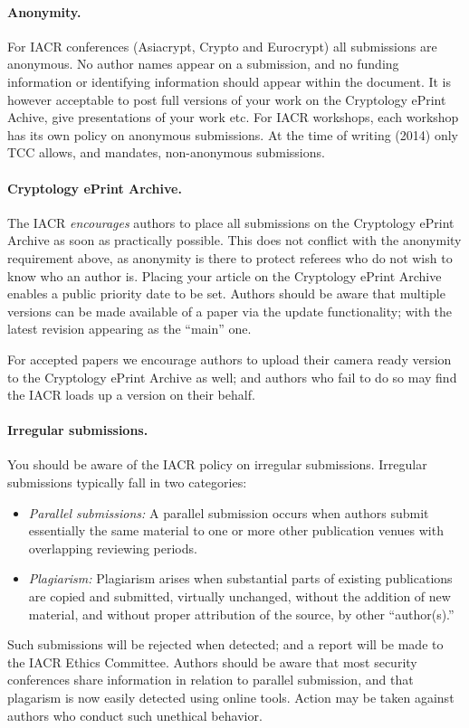 \documentclass[11pt]{article}
\begin{document}
\paragraph{Anonymity.}
For IACR conferences (Asiacrypt, Crypto and Eurocrypt)
all submissions are anonymous. 
No author names appear on a submission, and no funding information
or identifying information should appear within the document.
It is however acceptable to post full versions of your work
on the Cryptology ePrint Achive, give presentations of your work
etc.
For IACR workshops, each workshop has its own policy
on anonymous submissions. At the time of writing (2014) only TCC allows,
and mandates, non-anonymous submissions.

\paragraph{Cryptology ePrint Archive.}
The IACR \emph{encourages} authors to place all submissions on
the Cryptology ePrint Archive as soon as practically possible.
This does not conflict with the anonymity requirement above, as
anonymity is there to protect referees who do not wish to 
know who an author is.
Placing your article on the Cryptology ePrint Archive enables a
public priority date to be set.
Authors should be aware that multiple versions can be made
available of a paper via the update functionality; with the 
latest revision appearing as the ``main'' one. 

For accepted papers we encourage authors to upload their camera ready 
version to the Cryptology ePrint Archive as well; and authors who fail to do
so may find the IACR loads up a version on their behalf.

\paragraph{Irregular submissions.}
You should be aware of the IACR policy on irregular submissions.
Irregular submissions typically fall in two categories:
\begin{itemize}
\item \emph{Parallel submissions:} A parallel submission occurs when
  authors submit essentially the same material to one or more other
  publication venues with overlapping reviewing periods.
\item \emph{Plagiarism:} Plagiarism arises when substantial parts of
  existing publications are copied and submitted, virtually unchanged,
  without the addition of new material, and without proper attribution
  of the source, by other ``author(s).''
\end{itemize}
Such submissions will be rejected when detected; and a report will be made
to the IACR Ethics Committee. 
Authors should be aware that most security conferences share information
in relation to parallel submission, and that plagarism is now easily
detected using online tools.
Action may be taken against authors who conduct such unethical behavior.
\end{document}
